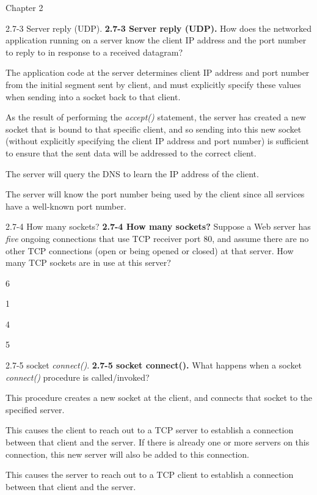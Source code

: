 \documentclass[11pt]{article}
\begin{document}
\begin{quiz}{Chapter 2}
\begin{multi}[points=1,shuffle]{2.7-3 Server reply (UDP).}
\textbf{2.7-3 Server reply (UDP).} 
How does the networked application running on a server know the client IP address and the port number to reply to in response to a received datagram?
\item* The  application code at the server determines client IP address and port number from the initial segment sent by client, and must explicitly specify these values when sending into a socket back to that client.
\item As the result of performing the \emph{accept()} statement, the server has created a new socket that is bound to that specific client, and so sending into this new socket (without explicitly specifying the client IP address and port number) is sufficient to ensure that the sent data will be addressed to the correct client.
\item The server will query the DNS to learn the IP address of the client.
\item The server will know the port number being used by the client since all services have a well-known port number.
\end{multi}

\begin{multi}[points=1,shuffle]{2.7-4 How many sockets?}
\textbf{2.7-4 How many sockets?} 
Suppose a Web server has \emph{five} ongoing connections that use TCP receiver port 80, and assume there are no other TCP connections (open or being opened or closed) at that server.  How many TCP sockets are in use at this server?
\item* 6
\item 1
\item 4
\item 5
\end{multi}

\begin{multi}[points=1,shuffle]{2.7-5 socket \emph{connect()}.}
\textbf{2.7-5 socket connect().} 
What happens when a socket \emph{connect()} procedure is called/invoked?
\item* This procedure creates a new socket at the client, and connects that socket to the specified server.
\item This causes the client to reach out to a TCP server to establish a connection between that client and the server. If there is already one or more servers on this connection, this new server will also be added to this connection.
\item This causes the server to reach out to a TCP client to establish a connection between that client and the server.
\end{multi}

\end{quiz}
\end{document}
